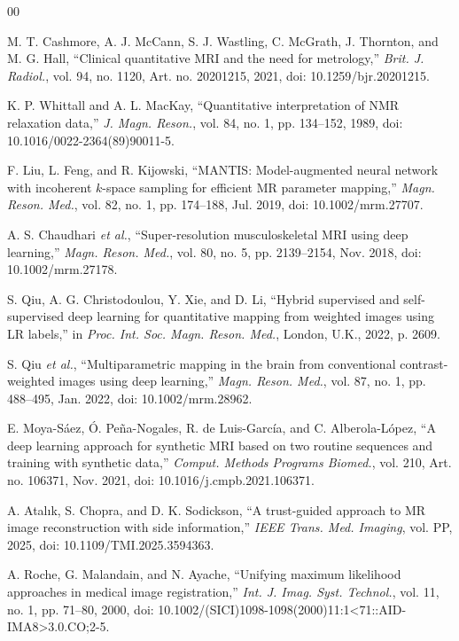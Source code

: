 \documentclass[journal,twoside,web]{ieeecolor}
\begin{document}
\begin{thebibliography}{00}

 M. T. Cashmore, A. J. McCann, S. J. Wastling, C. McGrath, J. Thornton, and M. G. Hall, ``Clinical quantitative MRI and the need for metrology,'' \emph{Brit. J. Radiol.}, vol. 94, no. 1120, Art. no. 20201215, 2021, doi: 10.1259/bjr.20201215.

 K. P. Whittall and A. L. MacKay, ``Quantitative interpretation of NMR relaxation data,'' \emph{J. Magn. Reson.}, vol. 84, no. 1, pp. 134--152, 1989, doi: 10.1016/0022-2364(89)90011-5.

 F. Liu, L. Feng, and R. Kijowski, ``MANTIS: Model-augmented neural network with incoherent $k$-space sampling for efficient MR parameter mapping,'' \emph{Magn. Reson. Med.}, vol. 82, no. 1, pp. 174--188, Jul. 2019, doi: 10.1002/mrm.27707.

 A. S. Chaudhari \emph{et al.}, ``Super-resolution musculoskeletal MRI using deep learning,'' \emph{Magn. Reson. Med.}, vol. 80, no. 5, pp. 2139--2154, Nov. 2018, doi: 10.1002/mrm.27178.

 S. Qiu, A. G. Christodoulou, Y. Xie, and D. Li, ``Hybrid supervised and self-supervised deep learning for quantitative mapping from weighted images using LR labels,'' in \emph{Proc. Int. Soc. Magn. Reson. Med.}, London, U.K., 2022, p. 2609.

 S. Qiu \emph{et al.}, ``Multiparametric mapping in the brain from conventional contrast-weighted images using deep learning,'' \emph{Magn. Reson. Med.}, vol. 87, no. 1, pp. 488--495, Jan. 2022, doi: 10.1002/mrm.28962.

 E. Moya-Sáez, Ó. Peña-Nogales, R. de Luis-García, and C. Alberola-López, ``A deep learning approach for synthetic MRI based on two routine sequences and training with synthetic data,'' \emph{Comput. Methods Programs Biomed.}, vol. 210, Art. no. 106371, Nov. 2021, doi: 10.1016/j.cmpb.2021.106371.

 A. Atalık, S. Chopra, and D. K. Sodickson, ``A trust-guided approach to MR image reconstruction with side information,'' \emph{IEEE Trans. Med. Imaging}, vol. PP, 2025, doi: 10.1109/TMI.2025.3594363.

 A. Roche, G. Malandain, and N. Ayache, ``Unifying maximum likelihood approaches in medical image registration,'' \emph{Int. J. Imag. Syst. Technol.}, vol. 11, no. 1, pp. 71--80, 2000, doi: 10.1002/(SICI)1098-1098(2000)11:1<71::AID-IMA8>3.0.CO;2-5.


\end{thebibliography}
\end{document}
